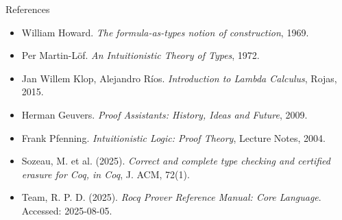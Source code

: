 \documentclass[aspectratio=169, 12pt]{beamer}
\begin{document}
\begin{frame}{References}
\footnotesize
\begin{itemize}
  \item William Howard. \textit{The formula-as-types notion of construction}, 1969.
  \item Per Martin-Löf. \textit{An Intuitionistic Theory of Types}, 1972.
  \item Jan Willem Klop, Alejandro Ríos. \textit{Introduction to Lambda Calculus}, Rojas, 2015.
  \item Herman Geuvers. \textit{Proof Assistants: History, Ideas and Future}, 2009.
  \item Frank Pfenning. \textit{Intuitionistic Logic: Proof Theory}, Lecture Notes, 2004.
 \item Sozeau, M. et al. (2025). \textit{Correct and complete type checking and certified erasure for Coq, in Coq}, J. ACM, 72(1).
  \item Team, R. P. D. (2025). \textit{Rocq Prover Reference Manual: Core Language}. Accessed: 2025-08-05.
\end{itemize}
\end{frame}


  
\end{document}
